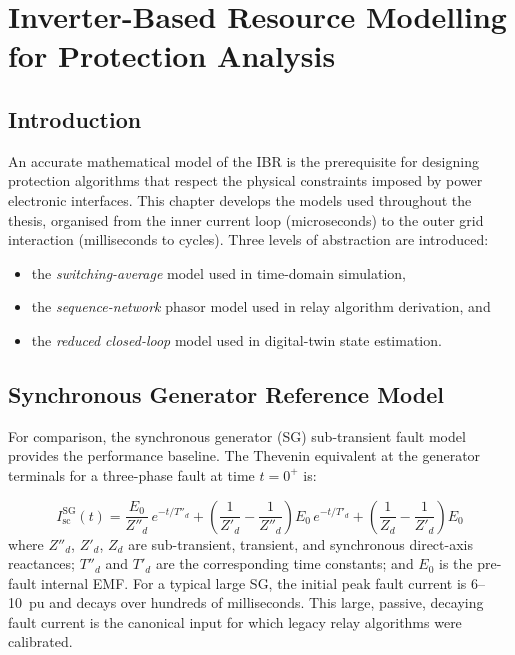 \chapter{Inverter-Based Resource Modelling for Protection Analysis}
\label{ch:modelling}

\section{Introduction}
\label{sec:ch2_intro}

An accurate mathematical model of the IBR is the prerequisite for designing
protection algorithms that respect the physical constraints imposed by power
electronic interfaces. This chapter develops the models used throughout the
thesis, organised from the inner current loop (microseconds) to the outer
grid interaction (milliseconds to cycles). Three levels of abstraction are
introduced:
\begin{itemize}
\item the \emph{switching-average} model used in time-domain simulation,
\item the \emph{sequence-network} phasor model used in relay algorithm derivation, and
\item the \emph{reduced closed-loop} model used in digital-twin state estimation.
\end{itemize}

\section{Synchronous Generator Reference Model}
\label{sec:ch2_sg_model}

For comparison, the synchronous generator (SG) sub-transient fault model
provides the performance baseline. The Thevenin equivalent at the generator
terminals for a three-phase fault at time $t=0^+$ is:

\begin{equation}
  I_\mathrm{sc}^\mathrm{SG}(t) = \frac{E_0}{Z''_d}\,e^{-t/T''_d}
  + \left(\frac{1}{Z'_d} - \frac{1}{Z''_d}\right)E_0\,e^{-t/T'_d}
  + \left(\frac{1}{Z_d} - \frac{1}{Z'_d}\right)E_0
  \label{eq:ch2_sg_fault}
\end{equation}
where $Z''_d$, $Z'_d$, $Z_d$ are sub-transient, transient, and synchronous
direct-axis reactances; $T''_d$ and $T'_d$ are the corresponding time
constants; and $E_0$ is the pre-fault internal EMF. For a typical large SG,
the initial peak fault current is 6--10~pu and decays over hundreds of
milliseconds. This large, passive, decaying fault current is the canonical
input for which legacy relay algorithms were calibrated.

